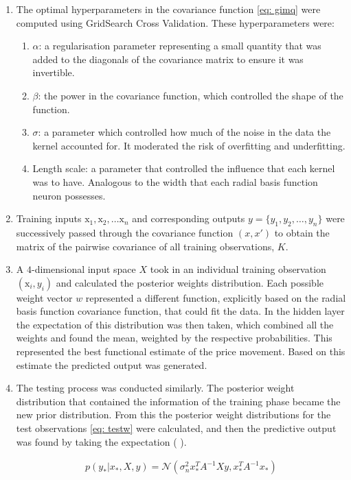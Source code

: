 \documentclass[11pt,a4paper]{article}
\newcommand{\citeboth}[1]{\citeauthor{#1} \citep{#1}}
\begin{document}
\begin{enumerate}
    \item The optimal hyperparameters in the covariance function \eqref{eq: gimq} 
    were computed using GridSearch Cross Validation. These hyperparameters were:
    \begin{enumerate}
        \item $\alpha$: a regularisation parameter representing a small quantity
        that was added to the diagonals of the covariance matrix to ensure it was 
        invertible. 
        \item $\beta$: the power in the covariance function, which controlled the shape of the function.
        \item $\sigma$: a parameter which controlled how much of the noise in the data the kernel accounted for. It moderated the risk of overfitting and underfitting.
        \item Length scale: a parameter that controlled the influence that each kernel was to have. Analogous to 
        the width that each radial basis function neuron possesses.
    \end{enumerate}
    \item Training inputs $\boldsymbol{\mathrm{x}}_1, \boldsymbol{\mathrm{x}}_2,\ldots \boldsymbol{\mathrm{x}}_{n}$
    and corresponding outputs \( y = \{y_1, y_2, \dots, y_n\} \) were successively passed through the 
    covariance function $(x,x')$ to obtain the matrix of the pairwise covariance of 
    all training observations, $K$.
    \item A $4$-dimensional input space $X$ took in an individual training observation $(\boldsymbol{\mathrm{x}}_{i}, y_i)$ and 
    calculated the posterior weights distribution. 
    Each possible weight vector $w$ represented a different function, explicitly 
    based on the radial basis function covariance function, that could fit the data. In the 
    hidden layer the expectation of this distribution was then taken, which
    combined all the weights and found the mean, weighted by the 
    respective probabilities. This represented the best functional estimate of the price movement. Based on this estimate 
    the predicted output was generated.
    \item The testing process was conducted similarly. The 
    posterior weight distribution that contained the information of the training phase became the new 
    prior distribution. From this the posterior weight distributions for the test observations \eqref{eq: testw}
    were calculated, and then the predictive output was found by taking the expectation (\citeboth{rasmussen2006}).
    
    \begin{align}
        p(y_{*}|x_{*}, X, y) = \mathcal{N}(\sigma_{n}^{2} x_{*}^{T}A^{-1}Xy, x_{*}^{T}A^{-1}x_{*}) \label{eq: testw}
    \end{align}
\end{enumerate}
\end{document}
